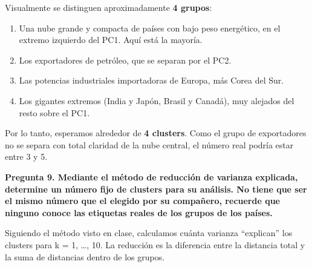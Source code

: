 \documentclass[
]{article}
\providecommand{\tightlist}{%
  \setlength{\itemsep}{0pt}\setlength{\parskip}{0pt}}
\begin{document}
Visualmente se distinguen aproximadamente \textbf{4 grupos}:

\begin{enumerate}
\def\labelenumi{\arabic{enumi}.}
\tightlist
\item
  Una nube grande y compacta de países con bajo peso energético, en el
  extremo izquierdo del PC1. Aquí está la mayoría.
\item
  Los exportadores de petróleo, que se separan por el PC2.
\item
  Las potencias industriales importadoras de Europa, más Corea del Sur.
\item
  Los gigantes extremos (India y Japón, Brasil y Canadá), muy alejados
  del resto sobre el PC1.
\end{enumerate}

Por lo tanto, esperamos alrededor de \textbf{4 clusters}. Como el grupo
de exportadores no se separa con total claridad de la nube central, el
número real podría estar entre 3 y 5.

\noindent\textbf{Pregunta 9. Mediante el método de reducción de varianza explicada, determine un número fijo de clusters para su análisis. No tiene que ser el mismo número que el elegido por su compañero, recuerde que ninguno conoce las etiquetas reales de los grupos de los países.}

Siguiendo el método visto en clase, calculamos cuánta varianza
``explican'' los clusters para k = 1, \ldots, 10. La reducción es la
diferencia entre la distancia total y la suma de distancias dentro de
los grupos.
\end{document}

